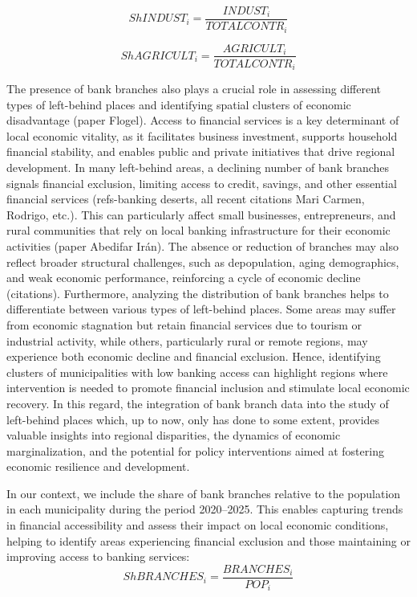 \documentclass[a4paper,11pt,oneside]{article}
\begin{document}
\begin{equation}
\label{eq:eq6}
ShINDUST_i = \frac{INDUST_i}{TOTALCONTR_i}
\end{equation}

\begin{equation}
\label{eq:eq7}
ShAGRICULT_i = \frac{AGRICULT_i}{TOTALCONTR_i}
\end{equation}



The presence of bank branches also plays a crucial role in assessing different types of left-behind places and identifying spatial clusters of economic disadvantage {\color{red} (paper Flogel)}. Access to financial services is a key determinant of local economic vitality, as it facilitates business investment, supports household financial stability, and enables public and private initiatives that drive regional development. In many left-behind areas, a declining number of bank branches signals financial exclusion, limiting access to credit, savings, and other essential financial services {\color{red} (refs-banking deserts, all recent citations Mari Carmen, Rodrigo, etc.)}. This can particularly affect small businesses, entrepreneurs, and rural communities that rely on local banking infrastructure for their economic activities {\color{red} (paper Abedifar Ir\'an)}. The absence or reduction of branches may also reflect broader structural challenges, such as depopulation, aging demographics, and weak economic performance, reinforcing a cycle of economic decline {\color{red} (citations)}. Furthermore, analyzing the distribution of bank branches helps to differentiate between various types of left-behind places. Some areas may suffer from economic stagnation but retain financial services due to tourism or industrial activity, while others, particularly rural or remote regions, may experience both economic decline and financial exclusion. Hence, identifying clusters of municipalities with low banking access can highlight regions where intervention is needed to promote financial inclusion and stimulate local economic recovery. In this regard, the integration of bank branch data into the study of left-behind places which, up to now, {\color{red} only} \cite{Flogel} has done to some extent, provides valuable insights into regional disparities, the dynamics of economic marginalization, and the potential for policy interventions aimed at fostering economic resilience and development.



In our context, we include the share of bank branches relative to the population in each municipality during the period 2020--2025. This enables capturing trends in financial accessibility and assess their impact on local economic conditions, helping to identify areas experiencing financial exclusion and those maintaining or improving access to banking services:
%
\begin{equation}
\label{eq:eq8}
ShBRANCHES_i = \frac{BRANCHES_i}{POP_i}
\end{equation}
\end{document}
